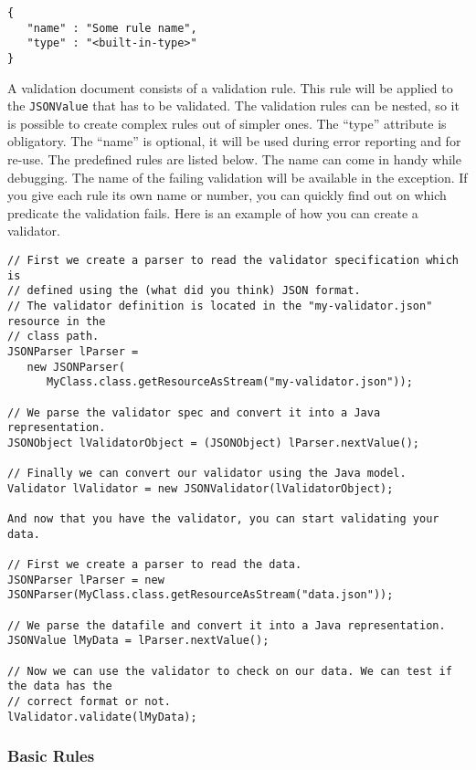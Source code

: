 \documentclass[a4paper]{article}
\begin{document}
\medskip
\begin{lstlisting}
{
   "name" : "Some rule name",
   "type" : "<built-in-type>"
}
\end{lstlisting}
\medskip

A validation document consists of a validation rule. This rule will be applied to the \lstinline{JSONValue} that has to be validated. The validation rules can be nested, so it is possible to create complex rules out of simpler ones. The ``type'' attribute is obligatory.  The  ``name'' is optional, it will be used during error reporting and for re-use.  The predefined rules are listed below. The name can come in handy while debugging. The name of the failing validation will be available in the exception. If you give each rule its own name or number, you can quickly find out on which predicate the validation fails. Here is an example of how you can create a validator.

\medskip
\begin{lstlisting}[basicstyle=\ttfamily\scriptsize{}]
// First we create a parser to read the validator specification which is 
// defined using the (what did you think) JSON format.
// The validator definition is located in the "my-validator.json" resource in the
// class path.
JSONParser lParser = 
   new JSONParser(
      MyClass.class.getResourceAsStream("my-validator.json"));

// We parse the validator spec and convert it into a Java representation.
JSONObject lValidatorObject = (JSONObject) lParser.nextValue();

// Finally we can convert our validator using the Java model.
Validator lValidator = new JSONValidator(lValidatorObject);

And now that you have the validator, you can start validating your data.

// First we create a parser to read the data. 
JSONParser lParser = new JSONParser(MyClass.class.getResourceAsStream("data.json"));

// We parse the datafile and convert it into a Java representation.
JSONValue lMyData = lParser.nextValue();

// Now we can use the validator to check on our data. We can test if the data has the 
// correct format or not. 
lValidator.validate(lMyData);
\end{lstlisting}
\medskip

\subsubsection{Basic Rules}
\end{document}
